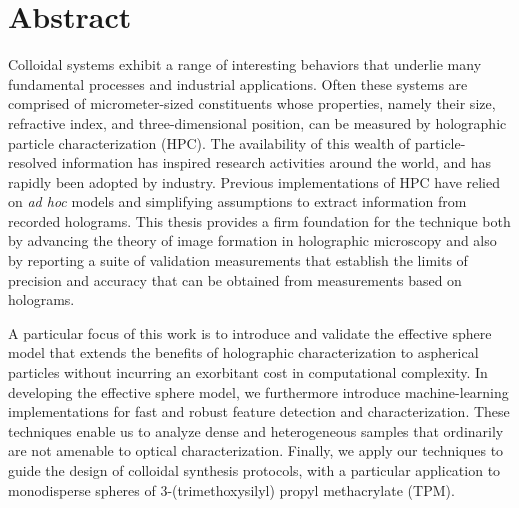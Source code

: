\chapter*{Abstract}
\label{ch:abstract}


{
\fancyhf{}
}


Colloidal systems exhibit a range of interesting behaviors that
underlie many fundamental processes and industrial applications.
Often these systems are comprised of
micrometer-sized constituents whose properties, namely their
size, refractive index, and three-dimensional position, can be measured
by holographic particle characterization (HPC).
The availability of this wealth of particle-resolved information
has inspired research activities around the world, and has rapidly
been adopted by industry.
Previous implementations of HPC have relied on \emph{ad hoc}
models and simplifying assumptions to extract information from
recorded holograms.
This thesis provides a firm foundation for the technique both by
advancing the theory of image formation in holographic microscopy
and also by reporting a suite of validation measurements
that establish the limits of precision and accuracy that can be
obtained from measurements based on holograms.

A particular focus of this work is to introduce and validate
the effective sphere model that extends the benefits of holographic
characterization to aspherical particles without incurring
an exorbitant cost in computational complexity.
In developing the effective sphere model, we furthermore 
introduce machine-learning implementations for fast and robust feature
detection and characterization.  These techniques enable us to
analyze dense and heterogeneous samples that ordinarily are
not amenable to optical characterization.
Finally, we apply our techniques to guide the design of colloidal
synthesis protocols, with a particular application to 
monodisperse spheres of 3-(trimethoxysilyl) propyl methacrylate
(TPM).


